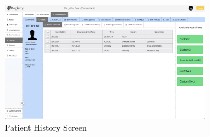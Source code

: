 \documentclass[12pt,a4paper]{report}
\begin{document}
\begin{figure}[h]
\begin{center}
\includegraphics[width=0.8\textwidth,scale=0.25]{images/patient-history.png}	
\end{center}
\caption{Patient History Screen}
\label{fig:patient-history}
\end{figure}




%


\printbibliography[nottype=book,heading=bibliography,title={References}]
\end{document}
